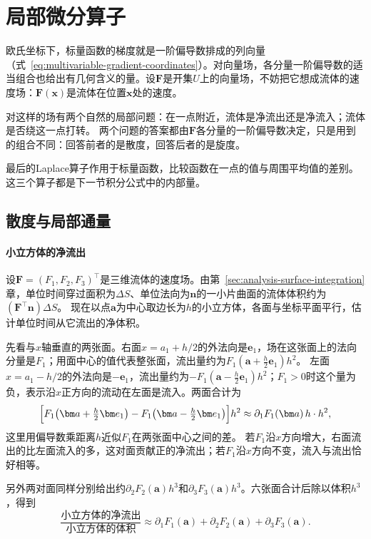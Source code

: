 \section{局部微分算子}
\label{sec:multivariable-differential-operators}

欧氏坐标下，标量函数的梯度就是一阶偏导数排成的列向量（式~\eqref{eq:multivariable-gradient-coordinates}）。对向量场，各分量一阶偏导数的适当组合也给出有几何含义的量。设$\bm F$是开集$U$上的向量场，不妨把它想成流体的速度场：$\bm F(\bm x)$是流体在位置$\bm x$处的速度。

对这样的场有两个自然的局部问题：在一点附近，流体是净流出还是净流入；流体是否绕这一点打转。
两个问题的答案都由$\bm F$各分量的一阶偏导数决定，只是用到的组合不同：回答前者的是散度，回答后者的是旋度。

最后的Laplace算子作用于标量函数，比较函数在一点的值与周围平均值的差别。这三个算子都是下一节积分公式中的内部量。

\subsection{散度与局部通量}

\paragraph{小立方体的净流出}

设$\bm F=(F_1,F_2,F_3)^\top$是三维流体的速度场。由第~\ref{sec:analysis-surface-integration}章，单位时间穿过面积为$\Delta S$、单位法向为$\bm n$的一小片曲面的流体体积约为$(\bm F^\top\bm n)\Delta S$。
现在以点$\bm a$为中心取边长为$h$的小立方体，各面与坐标平面平行，估计单位时间从它流出的净体积。

先看与$x$轴垂直的两张面。右面$x=a_1+h/2$的外法向是$\bm e_1$，场在这张面上的法向分量是$F_1$；用面中心的值代表整张面，流出量约为$F_1(\bm a+\tfrac h2\bm e_1)h^2$。
左面$x=a_1-h/2$的外法向是$-\bm e_1$，流出量约为$-F_1(\bm a-\tfrac h2\bm e_1)h^2$；$F_1>0$时这个量为负，表示沿$x$正方向的流动在左面是流入。两面合计为
\[
 \Bigl[F_1\bigl(\bm a+\tfrac h2\bm e_1\bigr)-F_1\bigl(\bm a-\tfrac h2\bm e_1\bigr)\Bigr]h^2
 \approx \partial_1F_1(\bm a)\,h\cdot h^2,
\]
这里用偏导数乘距离$h$近似$F_1$在两张面中心之间的差。
若$F_1$沿$x$方向增大，右面流出的比左面流入的多，这对面贡献正的净流出；若$F_1$沿$x$方向不变，流入与流出恰好相等。

另外两对面同样分别给出约$\partial_2F_2(\bm a)h^3$和$\partial_3F_3(\bm a)h^3$。六张面合计后除以体积$h^3$，得到
\[
 \frac{\text{小立方体的净流出}}{\text{小立方体的体积}}
 \approx\partial_1F_1(\bm a)+\partial_2F_2(\bm a)+\partial_3F_3(\bm a).
\]

